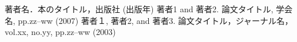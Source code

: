 \renewcommand{\bibname}{参考文献}
\begin{thebibliography}{99}
 著者名．本のタイトル，出版社 (出版年)
 著者1 and 著者2. 論文タイトル, 学会名, pp.zz--ww (2007)
 著者１, 著者2, and 著者3. 論文タイトル，ジャーナル名，vol.xx, no.yy, pp.zz--ww (2003)
\end{thebibliography}